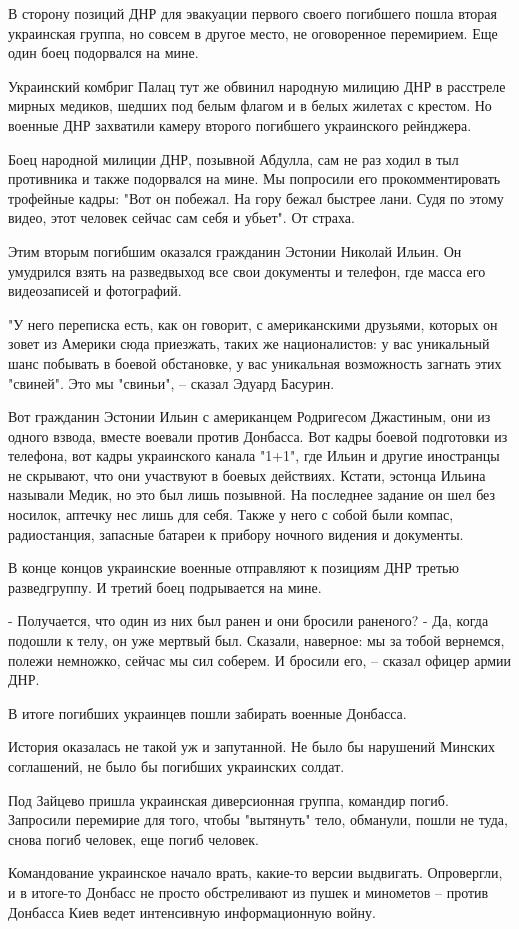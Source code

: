 В сторону позиций ДНР для эвакуации первого своего погибшего пошла вторая
украинская группа, но совсем в другое место, не оговоренное перемирием. Еще
один боец подорвался на мине.

Украинский комбриг Палац тут же обвинил народную милицию ДНР в расстреле мирных
медиков, шедших под белым флагом и в белых жилетах с крестом. Но военные ДНР
захватили камеру второго погибшего украинского рейнджера.

Боец народной милиции ДНР, позывной Абдулла, сам не раз ходил в тыл противника
и также подорвался на мине. Мы попросили его прокомментировать трофейные кадры:
"Вот он побежал. На гору бежал быстрее лани. Судя по этому видео, этот человек
сейчас сам себя и убьет". От страха.

Этим вторым погибшим оказался гражданин Эстонии Николай Ильин. Он умудрился
взять на разведвыход все свои документы и телефон, где масса его видеозаписей и
фотографий.

"У него переписка есть, как он говорит, с американскими друзьями, которых он
зовет из Америки сюда приезжать, таких же националистов: у вас уникальный шанс
побывать в боевой обстановке, у вас уникальная возможность загнать этих
"свиней". Это мы "свиньи", – сказал Эдуард Басурин.

Вот гражданин Эстонии Ильин с американцем Родригесом Джастиным, они из одного
взвода, вместе воевали против Донбасса. Вот кадры боевой подготовки из
телефона, вот кадры украинского канала "1+1", где Ильин и другие иностранцы не
скрывают, что они участвуют в боевых действиях. Кстати, эстонца Ильина называли
Медик, но это был лишь позывной. На последнее задание он шел без носилок,
аптечку нес лишь для себя. Также у него с собой были компас, радиостанция,
запасные батареи к прибору ночного видения и документы.

В конце концов украинские военные отправляют к позициям ДНР третью
разведгруппу. И третий боец подрывается на мине.

- Получается, что один из них был ранен и они бросили раненого?  - Да, когда
подошли к телу, он уже мертвый был. Сказали, наверное: мы за тобой вернемся,
полежи немножко, сейчас мы сил соберем. И бросили его, – сказал офицер армии
ДНР.

В итоге погибших украинцев пошли забирать военные Донбасса.

История оказалась не такой уж и запутанной. Не было бы нарушений Минских
соглашений, не было бы погибших украинских солдат.

Под Зайцево пришла украинская диверсионная группа, командир погиб. Запросили
перемирие для того, чтобы "вытянуть" тело, обманули, пошли не туда, снова погиб
человек, еще погиб человек. 

Командование украинское начало врать, какие-то версии выдвигать. Опровергли, и
в итоге-то Донбасс не просто обстреливают из пушек и минометов – против
Донбасса Киев ведет интенсивную информационную войну.
  
